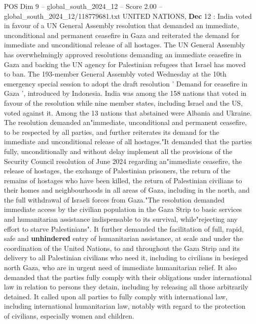 \begin{textsample}{POS Dim 9 – global\_south\_2024\_12 – Score 2.00 – global\_south\_2024\_12/118779681.txt}  \label{ex:f9_pos_330}
UNITED NATIONS, \textbf{Dec} 12 : India voted in favour of a UN General Assembly resolution that demanded an immediate, unconditional and permanent ceasefire in Gaza and reiterated the demand for immediate and unconditional release of all hostages.
The UN General Assembly has overwhelmingly approved resolutions demanding an immediate ceasefire in Gaza and backing the UN agency for Palestinian refugees that Israel has moved to ban.
The 193-member General Assembly voted Wednesday at the 10th emergency special session to adopt the draft resolution ' Demand for ceasefire in Gaza ', introduced by Indonesia.
India was among the 158 nations that voted in favour of the resolution while nine member states, including Israel and the US, voted against it.
Among the 13 nations that abstained were Albania and Ukraine.
The resolution demanded an"immediate, unconditional and permanent ceasefire, to be respected by all parties, and further reiterates its demand for the immediate and unconditional release of all hostages."It demanded that the parties fully, unconditionally and without delay implement all the provisions of the Security Council resolution of June 2024 regarding an"immediate ceasefire, the release of hostages, the exchange of Palestinian prisoners, the return of the remains of hostages who have been killed, the return of Palestinian civilians to their homes and neighbourhoods in all areas of Gaza, including in the north, and the full withdrawal of Israeli forces from Gaza."The resolution demanded immediate access by the civilian population in the Gaza Strip to basic services and humanitarian assistance indispensable to its survival, while"rejecting any effort to starve Palestinians".
It further demanded the facilitation of full, rapid, safe and \textbf{unhindered} entry of humanitarian assistance, at scale and under the coordination of the United Nations, to and throughout the Gaza Strip and its delivery to all Palestinian civilians who need it, including to civilians in besieged north Gaza, who are in urgent need of immediate humanitarian relief.
It also demanded that the parties fully comply with their obligations under international law in relation to persons they detain, including by releasing all those arbitrarily detained.
It called upon all parties to fully comply with international law, including international humanitarian law, notably with regard to the protection of civilians, especially women and children.

\end{textsample}
